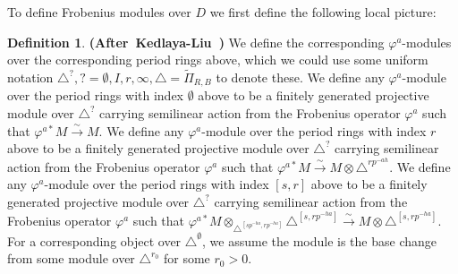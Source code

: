 \documentclass[12pt]{amsart}
\theoremstyle{definition}
\newtheorem{definition}[theorem]{Definition}
\numberwithin{equation}{section}
\begin{document}
\indent To define Frobenius modules over $D$ we first define the following local picture:
 


\begin{definition} \mbox{\bf{(After Kedlaya-Liu \cite[Definition 4.4.4]{KL2})}}
We define the corresponding $\varphi^a$-modules over the corresponding period rings above, which we could use some uniform notation $\triangle^?,?=\emptyset,I,r,\infty,\triangle=\widetilde{\Pi}_{R,B}$ to denote these. We define any $\varphi^a$-module over the period rings with index $\emptyset$ above to be a finitely generated projective module over $\triangle^?$ carrying semilinear action from the Frobenius operator $\varphi^a$ such that $\varphi^{a*}M\overset{\sim}{\rightarrow}M$. We define any $\varphi^a$-module over the period rings with index $r$ above to be a finitely generated projective module over $\triangle^?$ carrying semilinear action from the Frobenius operator $\varphi^a$ such that $\varphi^{a*}M\overset{\sim}{\rightarrow}M\otimes \triangle^{rp^{-ah}}$. We define any $\varphi^a$-module over the period rings with index $[s,r]$ above to be a finitely generated projective module over $\triangle^?$ carrying semilinear action from the Frobenius operator $\varphi^a$ such that $\varphi^{a*}M\otimes_{\triangle^{[sp^{-ha},rp^{-ha}]}} \triangle^{[s,rp^{-ha}]}\overset{\sim}{\rightarrow}M\otimes \triangle^{[s,rp^{-ha}]}$. For a corresponding object over $\triangle^\emptyset$, we assume the module is the base change from some module over $\triangle^{r_0}$ for some $r_0>0$.
\end{definition}
\end{document}
